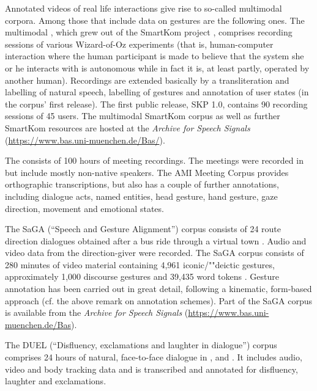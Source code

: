 \documentclass[output=paper,biblatex,babelshorthands,newtxmath,draftmode,colorlinks,citecolor=brown]{langscibook}
\begin{document}
Annotated videos of real life interactions give rise to so-called multimodal corpora. 
%
Among those that include data on gestures are the following ones.
%
The multimodal  \citep{Schiel:Steininger:Tuerk:2003}, which grew out of the SmartKom project \citep{Wahlster:2006}, comprises recording sessions of various Wizard-of-Oz experiments (that is, human-computer interaction where the human participant is made to believe that the system she or he interacts with is autonomous while in fact it is, at least partly, operated by another human).
%
Recordings are extended basically by a transliteration and labelling of natural speech, labelling of gestures and annotation of user states (in the corpus' first release). 
%
The first public release, SKP 1.0, contains 90 recording sessions of 45 users. 
%
The multimodal SmartKom corpus as well as further SmartKom resources are hosted at the \textit{ Archive for Speech Signals} (\url{https://www.bas.uni-muenchen.de/Bas/}).


The  \citep{Carletta:et:al:2006} consists of 100 hours of meeting recordings.
%
The meetings were recorded in  but include mostly non-native speakers. 
%
The AMI Meeting Corpus provides orthographic transcriptions, but also has a couple of further annotations, including dialogue acts, named entities, head gesture, hand gesture, gaze direction, movement and emotional states.


The SaGA (\enquote{Speech and Gesture Alignment}) corpus consists of 24  route direction dialogues obtained after a bus ride through a virtual town \citep{Luecking:Bergmann:Hahn:Kopp:Rieser:2010}. 
%
Audio and video data from the direction-giver were recorded. 
%
The SaGA corpus consists of 280 minutes of video material containing 4,961 iconic/""deictic gestures, approximately 1,000 discourse gestures and 39,435 word tokens \citep{Luecking:Bergmann:Hahn:Kopp:Rieser:2013}.
%
Gesture annotation has been carried out in great detail, following a kinematic, form-based approach (cf. the above remark on annotation schemes).
%
Part of the SaGA corpus is available from the \textit{ Archive for Speech Signals} (\url{https://www.bas.uni-muenchen.de/Bas}).

\largerpage
The DUEL (\enquote{Disfluency, exclamations and laughter in dialogue}) corpus \citep{Hough:Tian:de:Ruiter:Betz:Kousidis:Schlangen:Ginzburg:2016} comprises 24 hours of natural, face-to-face dialogue in ,  and .
%
It includes audio, video and body tracking data and is transcribed and annotated for disfluency, laughter and exclamations.
\end{document}
